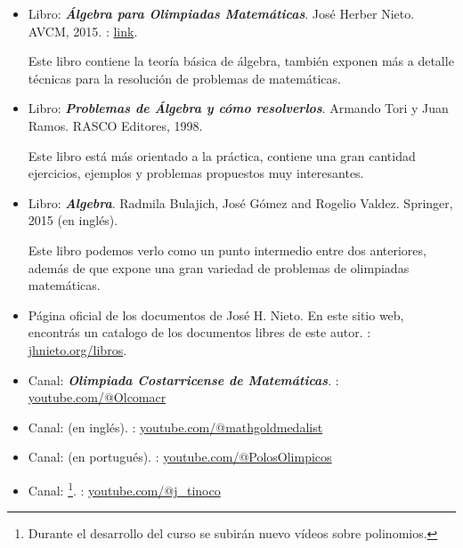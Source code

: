 \begin{itemize}
    \item Libro: \textit{\textbf{Álgebra para Olimpiadas Matemáticas}}. José Herber Nieto. AVCM, 2015.
    : \href{https://acmfiles.s3.amazonaws.com/Libros/AlgebraParaOlimpiadas.pdf}{link}.

    Este libro contiene la teoría básica de álgebra, también exponen más a detalle técnicas para la resolución de problemas de matemáticas.
    \item Libro: \textit{\textbf{Problemas de Álgebra y cómo resolverlos}}. Armando Tori y Juan Ramos. RASCO Editores, 1998.

    Este libro está más orientado a la práctica, contiene una gran cantidad ejercicios, ejemplos y problemas propuestos muy interesantes.
    \item Libro: \textit{\textbf{Algebra}}. Radmila Bulajich, José Gómez and Rogelio Valdez. Springer, 2015 (en inglés).

    Este libro podemos verlo como un punto intermedio entre dos anteriores, además de que expone una gran variedad de problemas de olimpiadas matemáticas.
    \item Página oficial de los documentos de José H. Nieto.
    En este sitio web, encontrás un catalogo de los documentos libres de este autor.
    : \href{https://www.jhnieto.org/libros.htm}{jhnieto.org/libros}.
    \item Canal: \textit{\textbf{Olimpiada Costarricense de Matemáticas}}. : \href{https://www.youtube.com/@Olcomacr}{youtube.com/@Olcomacr}
    \item Canal:  (en inglés). : \href{https://www.youtube.com/@mathgoldmedalist}{youtube.com/@mathgoldmedalist}
    \item Canal:  (en portugués). : \href{https://www.youtube.com/@PolosOlimpicos}{youtube.com/@PolosOlimpicos}
    \item Canal: \footnote{Durante el desarrollo del curso se subirán nuevo vídeos sobre polinomios.}. : \href{https://www.youtube.com/channel/UCXFWu2nZqMJ5hEJS37Uf3cA}{youtube.com/@j\_tinoco}
\end{itemize}
